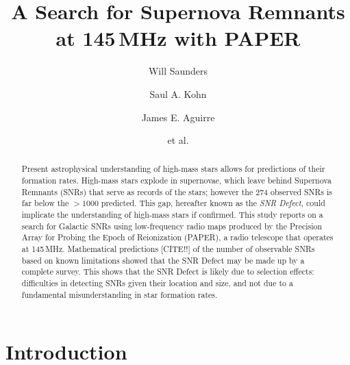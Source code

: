 \documentclass[preprint2,epsf,epsfig,graphics]{emulateapj}
\begin{document}
\title{A Search for Supernova Remnants at 145\,MHz with PAPER}

\author{Will Saunders}
\author{Saul A. Kohn}
\author{James E. Aguirre}
\author{et al.}



\begin{abstract}
Present astrophysical understanding of high-mass stars allows for predictions of their formation rates.  High-mass stars explode in supernovae, which leave behind Supernova Remnants (SNRs) that serve as records of the stars; however the 274 observed SNRs is far below the $>1000$ predicted.  This gap, hereafter known as the \textit{SNR Defect}, could implicate the understanding of high-mass stars if confirmed. This study reports on a search for Galactic SNRs using low-frequency radio maps produced by the Precision Array for Probing the Epoch of Reionization (PAPER), a radio telescope that operates at 145\,MHz.  
Mathematical predictions {\color{red}[CITE!!]} of the number of observable SNRs based on known limitations showed that the SNR Defect may be made up by a complete survey.  This shows that the SNR Defect is likely due to selection effects: difficulties in detecting SNRs given their location and size, and not due to a fundamental misunderstanding in star formation rates.
\end{abstract}

\section{Introduction}
\end{document}
